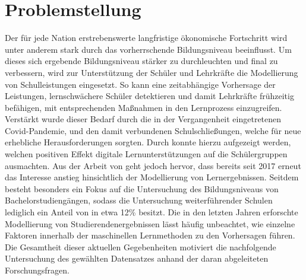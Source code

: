 \chapter[Problemstellung]{Problemstellung}

Der für jede Nation erstrebenswerte langfristige ökonomische Fortschritt wird unter anderem stark durch das vorherrschende Bildungsniveau beeinflusst. \cite[S. 1]{Cortez2008UsingDM} 
Um dieses sich ergebende Bildungsniveau stärker zu durchleuchten und final zu verbessern, wird zur Unterstützung der Schüler und Lehrkräfte die Modellierung von Schulleistungen eingesetzt. \cite[S. 1]{Cortez2008UsingDM} 
So kann eine zeitabhängige Vorhersage der Leistungen, lernschwächere Schüler detektieren und damit Lehrkräfte frühzeitig befähigen, mit entsprechenden Maßnahmen in den Lernprozess einzugreifen. \cite[S. 2]{Namoun.2021} 
Verstärkt wurde dieser Bedarf durch die in der Vergangenheit eingetretenen Covid-Pandemie, und den damit verbundenen Schulschließungen, welche für neue erhebliche Herausforderungen sorgten. \cite[S. 2]{Clark.2021} 
Durch \cite[S. 13]{Clark.2021} konnte hierzu aufgezeigt werden, welchen positiven Effekt digitale Lernunterstützungen auf die Schülergruppen ausmachten.
Aus der Arbeit von \cite[S. 9]{Namoun.2021} geht jedoch hervor, dass bereits seit 2017 erneut das Interesse anstieg hinsichtlich der Modellierung von Lernergebnissen.
Seitdem besteht besonders ein Fokus auf die Untersuchung des Bildungsniveaus von Bachelorstudiengängen, sodass die Untersuchung weiterführender Schulen lediglich ein Anteil von in etwa 12\% besitzt. \cite[S. 11]{Namoun.2021} 
Die in den letzten Jahren erforschte Modellierung von Studierendenergebnissen lässt häufig unbeachtet, wie einzelne Faktoren innerhalb der maschinellen Lernmethoden zu den Vorhersagen führen. \cite[S. 19]{Namoun.2021}
Die Gesamtheit dieser aktuellen Gegebenheiten motiviert die nachfolgende Untersuchung des gewählten Datensatzes anhand der daran abgeleiteten Forschungsfragen.